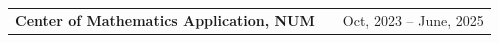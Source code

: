 \documentclass[a4paper,11pt]{article}
\makeatletter
\newcommand{\linkicon}{{\footnotesize\faExternalLink*}}
\newenvironment{jobshort}[2]
    {
    \begin{tabularx}{\linewidth}{@{}l X r@{}}
    \textbf{#1} & \hfill &  #2 \\[3.75pt]
    \end{tabularx}
    }
    {
    }
\makeatother
\begin{document}
\begin{jobshort}{Center of Mathematics Application, NUM}{Oct, 2023 -- June, 2025}
\begin{itemize}[nosep,after=\strut,leftmargin=1em,itemsep=3pt,label=--]


    
    
   
    
    
    


\end{itemize}
\end{jobshort}
\end{document}
